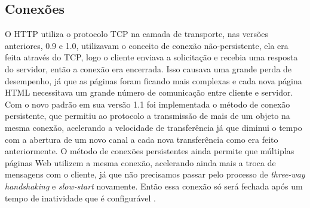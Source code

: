 


\subsection{Conexões}

O HTTP utiliza o protocolo TCP na camada de transporte, nas versões anteriores, 0.9 e 1.0, utilizavam o conceito de conexão não-persistente, ela era feita através do TCP, logo o cliente enviava a solicitação e recebia uma resposta do servidor, então a conexão era encerrada. Isso causava uma grande perda de desempenho, já que as páginas foram ficando mais complexas e cada nova página HTML necessitava um grande número de comunicação entre cliente e servidor. Com o novo padrão em sua versão 1.1 foi implementada o método de conexão persistente, que permitiu ao protocolo a transmissão de mais de um objeto na mesma conexão, acelerando a velocidade de transferência já que diminui o tempo com a abertura de um novo canal a cada nova transferência como era feito anteriormente.
O método de conexões persistentes ainda permite que múltiplas páginas Web utilizem a mesma conexão, acelerando ainda mais a troca de mensagens com o cliente, já que não precisamos passar pelo processo de \textit{three-way handshaking} e \textit{slow-start} novamente. Então essa conexão só será fechada após um tempo de inatividade que é configurável \cite{hirataprotocols}.

